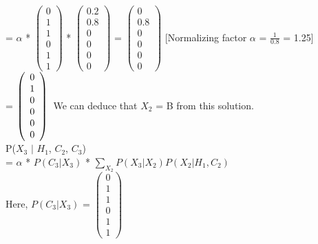 \documentclass{article}
\begin{document}
\indent 
= $\alpha$ * 
$\left(\begin{array}{c} 
        0  \\
        1 \\ 
        1 \\
        0 \\
        1 \\
        1
    \end{array}\right)$ * 
$\left(\begin{array}{c} 
        0.2 \\
        0.8 \\ 
        0 \\
        0 \\
        0 \\
        0
    \end{array}\right)$ 
= $\left(\begin{array}{c} 
        0 \\
        0.8 \\ 
        0 \\
        0 \\
        0 \\
        0
    \end{array}\right)$ [Normalizing factor $\alpha$ = $\frac{1}{0.8}$ = 1.25] \\ 

\indent 
= $\left(\begin{array}{c} 
        0 \\
        1 \\ 
        0 \\
        0 \\
        0 \\
        0
    \end{array}\right)\\$ 
\noindent
We can deduce that $X_2$ = B from this solution. \\

\noindent
P($X_{3}$ $\vert$ $H_{1}$, $C_{2}$, $C_{3}$)\\ 

\indent 
= $\alpha$ * $P(C_3 \vert X_3)$ * $\sum_{X_2}P(X_{3} \vert X_{2}) P(X_2 \vert H_{1}, C_{2})$ \\ 

Here, $P(C_3 \vert X_3)$ = 
$\left(\begin{array}{c} 
        0  \\
        1 \\ 
        1 \\
        0 \\
        1 \\
        1
    \end{array}\right)$ \\ 
\end{document}
